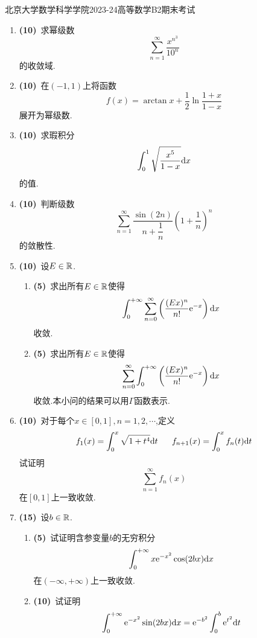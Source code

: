 \documentclass{ctexart}
\begin{document}
\pagestyle{empty}
\begin{center}\Large
    北京大学数学科学学院2023-24高等数学B2期末考试
\end{center}
\begin{enumerate}[leftmargin=*,label=\textbf{\arabic*.},topsep=0pt,parsep=0pt,itemsep=0pt,partopsep=0pt]
    \item \textbf{(10)}\ 求幂级数
        \[\sum_{n=1}^{\infty}\dfrac{x^{n^3}}{10^n}\]
        的收敛域.

    \item \textbf{(10)}\ 在$(-1,1)$上将函数
        \[f(x)=\arctan x+\dfrac12\ln\dfrac{1+x}{1-x}\]
        展开为幂级数.

    \item \textbf{(10)}\ 求瑕积分
        \[\int_0^1\sqrt{\dfrac{x^5}{1-x}}\mathrm{d} x\]
        的值.

    \item \textbf{(10)}\ 判断级数
        \[\sum_{n=1}^{\infty}\dfrac{\sin(2n)}{n+\dfrac1n}\left(1+\dfrac1n\right)^n\]
        的敛散性.
        
    \item \textbf{(10)}\ 设$E\in\mathbb{R}$.
        \begin{enumerate}[label=\tbf{(\arabic*)},topsep=0pt,parsep=0pt,itemsep=0pt,partopsep=0pt]
            \item \textbf{(5)}\ 求出所有$E\in\mathbb{R}$使得
                \[\int_0^{+\infty}\sum_{n=0}^{\infty}\left(\dfrac{(Ex)^n}{n!}\mathrm{e}^{-x}\right)\mathrm{d} x\]
                收敛.
            \item \textbf{(5)}\ 求出所有$E\in\mathbb{R}$使得
                \[\sum_{n=0}^{\infty}\int_0^{+\infty}\left(\dfrac{(Ex)^n}{n!}\mathrm{e}^{-x}\right)\mathrm{d} x\]
                收敛.本小问的结果可以用$\Gamma$函数表示.
        \end{enumerate}

    \item \textbf{(10)}\ 对于每个$x\in[0,1],n=1,2,\cdots$,定义
        \[f_1(x)=\int_0^x\sqrt{1+t^4}\di t\ \ \ \ \ f_{n+1}(x)=\int_0^xf_n(t)\di t\]
        试证明
        \[\sum_{n=1}^{\infty}f_n(x)\]
        在$[0,1]$上一致收敛.

    \item \textbf{(15)}\ 设$b\in\mathbb{R}$.
        \begin{enumerate}[label=\tbf{(\arabic*)},topsep=0pt,parsep=0pt,itemsep=0pt,partopsep=0pt]
            \item \textbf{(5)}\ 试证明含参变量$b$的无穷积分
                \[\int_0^{+\infty}x\mathrm{e}^{-x^2}\cos(2bx)\mathrm{d} x\]
                在$(-\infty,+\infty)$上一致收敛.
            \item \textbf{(10)}\ 试证明
                \[\int_0^{+\infty}\mathrm{e}^{-x^2}\sin(2bx)\mathrm{d} x=\mathrm{e}^{-b^2}\int_0^b\mathrm{e}^{t^2}\mathrm{d} t\]
        \end{enumerate}


\end{enumerate}
\end{document}
